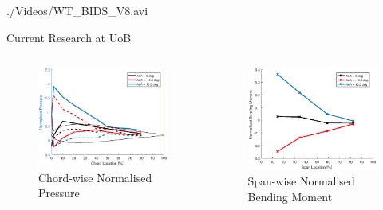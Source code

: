 \documentclass[aspectratio=169]{beamer}            %
\begin{document}
\begin{frame}[plain]

  \centering
    {./Videos/WT_BIDS_V8.avi}
	
\end{frame}
\begin{frame}{Current Research at UoB}

  \vspace{-1.5em}
	\begin{columns}
	  \begin{column}{0.5\textwidth}
		  \begin{figure}[!htb]
        \centering
				\includegraphics[height=0.6\textwidth]{PressureCoeffDistribution.eps}
				\caption{Chord-wise Normalised Pressure}
				\label{fig:CharSignals_Pressure}
      \end{figure}
		\end{column}
    \begin{column}{0.5\textwidth}
		  \begin{figure}[!htb]
        \centering
				\includegraphics[height=0.6\textwidth]{BendingMomentDistribution.eps}
				\caption{Span-wise Normalised Bending Moment}
				\label{fig:CharSignals_Bending}
      \end{figure}
		\end{column}
	\end{columns}


\end{frame}
\end{document}
